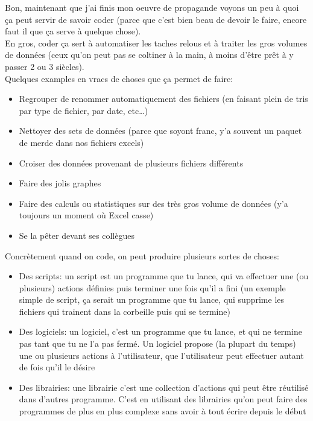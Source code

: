 \documentclass[a4paper, 11pt, oneside, draft]{book}
\begin{document}
\vspace{5mm}
Bon, maintenant que j'ai finis mon oeuvre de propagande voyons un peu \`a quoi \c ca peut servir de savoir coder (parce que c'est bien beau de devoir le faire, encore faut il que \c ca serve \`a quelque chose).\\
En gros, coder \c ca sert \`a automatiser les taches relous et \`a traiter les gros volumes de donn\'ees (ceux qu'on peut pas se coltiner \`a la main, \`a moins d'\^etre pr\^et \`a y passer 2 ou 3 si\`ecles).\\
Quelques examples en vracs de choses que \c ca permet de faire:
\begin{itemize}
\item Regrouper de renommer automatiquement des fichiers (en faisant plein de tris par type de fichier, par date, etc\dots)
\item Nettoyer des sets de donn\'ees (parce que soyont franc, y'a souvent un paquet de merde dans nos fichiers excels)
\item Croiser des donn\'ees provenant de plusieurs fichiers diff\'erents
\item Faire des jolis graphes
\item Faire des calculs ou statistiques sur des tr\`es gros volume de donn\'ees (y'a toujours un moment o\`u Excel casse)
\item Se la p\^eter devant ses coll\`egues
\end{itemize}
\vspace{5mm}
Concr\`etement quand on code, on peut produire plusieurs sortes de choses:
\begin{itemize}
\item Des scripts: un script est un programme que tu lance, qui va effectuer une (ou plusieurs) actions d\'efinies puis terminer une fois qu'il a fini (un exemple simple de script, \c ca serait un programme que tu lance, qui supprime les fichiers qui trainent dans la corbeille puis qui se termine)
\item Des logiciels: un logiciel, c'est un programme que tu lance, et qui ne termine pas tant que tu ne l'a pas ferm\'e. Un logiciel propose (la plupart du temps) une ou plusieurs actions \`a l'utilisateur, que l'utilisateur peut effectuer autant de fois qu'il le d\'esire
\item Des librairies: une librairie c'est une collection d'actions qui peut \^etre r\'eutilis\'e dans d'autres programme. C'est en utilisant des librairies qu'on peut faire des programmes de plus en plus complexe sans avoir \`a tout \'ecrire depuis le d\'ebut
\end{itemize}
\end{document}
